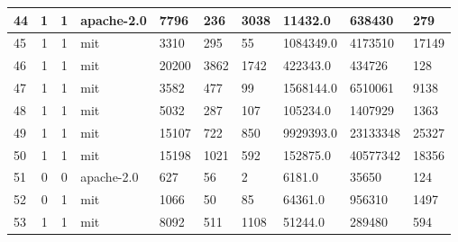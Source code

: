 \begin{landscape}
\begin{table}[]
{\begin{tabular}{lcclllllll}
                44 & 1                          & 1                     & apache-2.0       & 7796             & 236                   & 3038                         & 11432.0         & 638430             & 279                 \\ \hline
                45 & 1                          & 1                     & mit              & 3310             & 295                   & 55                           & 1084349.0       & 4173510            & 17149               \\ \hline
                46 & 1                          & 1                     & mit              & 20200            & 3862                  & 1742                         & 422343.0        & 434726             & 128                 \\ \hline
                47 & 1                          & 1                     & mit              & 3582             & 477                   & 99                           & 1568144.0       & 6510061            & 9138                \\ \hline
                48 & 1                          & 1                     & mit              & 5032             & 287                   & 107                          & 105234.0        & 1407929            & 1363                \\ \hline
                49 & 1                          & 1                     & mit              & 15107            & 722                   & 850                          & 9929393.0       & 23133348           & 25327               \\ \hline
                50 & 1                          & 1                     & mit              & 15198            & 1021                  & 592                          & 152875.0        & 40577342           & 18356               \\ \hline
                51 & 0                          & 0                     & apache-2.0       & 627              & 56                    & 2                            & 6181.0          & 35650              & 124                 \\ \hline
                52 & 0                          & 1                     & mit              & 1066             & 50                    & 85                           & 64361.0         & 956310             & 1497                \\ \hline
                53 & 1                          & 1                     & mit              & 8092             & 511                   & 1108                         & 51244.0         & 289480             & 594                 \\ \hline

\end{tabular}}
\end{table}
\end{landscape}
